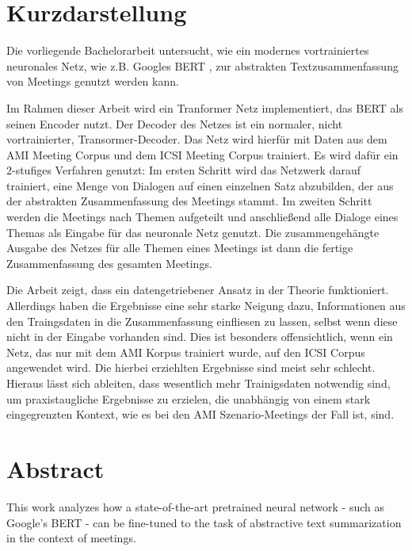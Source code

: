 \thispagestyle{empty}
\section*{Kurzdarstellung}
\label{sec:kurzdarstellung}

Die vorliegende Bachelorarbeit untersucht, wie ein modernes vortrainiertes neuronales Netz, wie z.B. Googles BERT \cite{devlin2018bert}, zur abstrakten Textzusammenfassung von Meetings genutzt werden kann.

Im Rahmen dieser Arbeit wird ein Tranformer Netz \cite{1706.03762} implementiert, das BERT als seinen Encoder nutzt.
Der Decoder des Netzes ist ein normaler, nicht vortrainierter, Transormer-Decoder.
Das Netz wird hierfür mit Daten aus dem AMI Meeting Corpus \cite{Mccowan05theami} und dem ICSI Meeting Corpus \cite{Janin} trainiert.
Es wird dafür ein 2-stufiges Verfahren genutzt:
Im ersten Schritt wird das Netzwerk darauf trainiert, eine Menge von Dialogen auf einen einzelnen Satz abzubilden, der aus der abstrakten Zusammenfassung des Meetings stammt.
Im zweiten Schritt werden die Meetings nach Themen aufgeteilt und anschließend alle Dialoge eines Themas als Eingabe für das neuronale Netz genutzt.
Die zusammengehängte Ausgabe des Netzes für alle Themen eines Meetings ist dann die fertige Zusammenfassung des gesamten Meetings.

Die Arbeit zeigt, dass ein datengetriebener Ansatz in der Theorie funktioniert.
Allerdings haben die Ergebnisse eine sehr starke Neigung dazu, Informationen aus den Traingsdaten in die Zusammenfassung einfliesen zu lassen, selbst wenn diese nicht in der Eingabe vorhanden sind.
Dies ist besonders offensichtlich, wenn ein Netz, das nur mit dem AMI Korpus trainiert wurde, auf den ICSI Corpus angewendet wird.
Die hierbei erziehlten Ergebnisse sind meist sehr schlecht.
Hieraus lässt sich ableiten, dass wesentlich mehr Trainigsdaten notwendig sind, um praxistaugliche Ergebnisse zu erzielen, die unabhängig von einem stark eingegrenzten Kontext, wie es bei den AMI Szenario-Meetings der Fall ist, sind.


\section*{Abstract}
\label{sec:abstract}

This work analyzes how a state-of-the-art pretrained neural network - such as Google's BERT \cite{devlin2018bert} - can be fine-tuned to the task of abstractive text summarization in the context of meetings.

